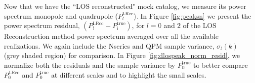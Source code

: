                                                                                                                                                                                                                                                                          Now that we have the ``LOS reconstructed" mock catalog, we measure its power 
                                                                                                                                                                                                                                                                         spectrum monopole and quadrupole ($P^\mathrm{LRec}_l$). In Figure 
                                                                                                                                                                                                                                                                         \ref{fig:peaksn} we present the power spectrum residual, 
                                                                                                                                                                                                                                                                         $(P^\mathrm{LRec}_l-P^\mathrm{true}_l)$,  
                                                                                                                                                                                                                                                                         for $l = 0$ and $2$ of the LOS Reconstruction method power spectrum averaged over all the available realizations. 
                                                                                                                                                                                                                                                                         We again include the Nseries and QPM sample variance, $\sigma_l(k)$ 
                                                                                                                                                                                                                                                                         (grey shaded region) for comparison.  In Figure \ref{fig:dlospeak_norm_resid}, 
                                                                                                                                                                                                                                                                         we normalize both the residuals and the sample variance by $P_0^\mathrm{true}$ 
                                                                                                                                                                                                                                                                         to better compare $P_0^\mathrm{LRec}$ and $P_0^\mathrm{true}$ at different scales 
                                                                                                                                                                                                                                                                         and to highlight the small scales. 


